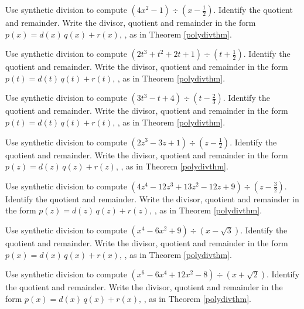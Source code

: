 \documentclass{ximera}
\begin{document}
\begin{problem}
Use synthetic division to compute $\left(4x^2-1 \right) \div \left(x - \frac{1}{2} \right)$.  Identify the quotient and remainder. Write the divisor, quotient and remainder in the form $p(x) = d(x) \, q(x) + r(x),\,$, as in Theorem \ref{polydivthm}.
\end{problem}

\begin{problem}
Use synthetic division to compute $\left(2t^3+t^2+2t+1 \right) \div \left(t + \frac{1}{2} \right)$.  Identify the quotient and remainder. Write the divisor, quotient and remainder in the form $p(t) = d(t) \, q(t) + r(t),\,$, as in Theorem \ref{polydivthm}.
\end{problem}

\begin{problem}
Use synthetic division to compute $\left(3t^3 - t + 4 \right) \div \left(t - \frac{2}{3} \right)$.  Identify the quotient and remainder. Write the divisor, quotient and remainder in the form $p(t) = d(t) \, q(t) + r(t),\,$, as in Theorem \ref{polydivthm}.
\end{problem}

\begin{problem}
Use synthetic division to compute $\left(2z^3 - 3z +1 \right) \div \left(z - \frac{1}{2} \right)$.  Identify the quotient and remainder. Write the divisor, quotient and remainder in the form $p(z) = d(z) \, q(z) + r(z),\,$, as in Theorem \ref{polydivthm}.
\end{problem}

\begin{problem}
Use synthetic division to compute $\left(4z^4-12z^3+13z^2 -12z+9\right) \div \left(z - \frac{3}{2} \right)$.  Identify the quotient and remainder. Write the divisor, quotient and remainder in the form $p(z) = d(z) \, q(z) + r(z),\,$, as in Theorem \ref{polydivthm}.
\end{problem}

\begin{problem}
Use synthetic division to compute $\left(x^4-6x^2+9 \right) \div \left(x -\sqrt{3} \right)$.  Identify the quotient and remainder. Write the divisor, quotient and remainder in the form $p(x) = d(x) \, q(x) + r(x),\,$, as in Theorem \ref{polydivthm}.
\end{problem}

\begin{problem}\label{synthdivreviewlast}
Use synthetic division to compute $\left(x^6-6x^4+12x^2-8\right) \div \left(x +\sqrt{2} \right)$.  Identify the quotient and remainder. Write the divisor, quotient and remainder in the form $p(x) = d(x) \, q(x) + r(x),\,$, as in Theorem \ref{polydivthm}.
\end{problem}
\end{document}

